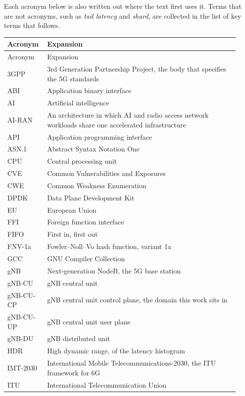 \documentclass[english,oneside,a4paper,censored,csm,software-track-2020]{HYthesisML}
\begin{document}
\noindent Each acronym below is also written out where the text first uses it. Terms that are
not acronyms, such as \emph{tail latency} and \emph{shard}, are collected in
the list of key terms that follows.

\begingroup
\singlespacing
\footnotesize
\renewcommand{\arraystretch}{1.15}
\begin{longtable}{@{}p{0.15\linewidth} p{0.79\linewidth}@{}}
\hline\hline
Acronym & Expansion \\
\hline
\endfirsthead
\hline\hline
Acronym & Expansion \\
\hline
\endhead
3GPP & 3rd Generation Partnership Project, the body that specifies the 5G standards \\
ABI & Application binary interface \\
AI & Artificial intelligence \\
AI-RAN & An architecture in which AI and radio access network workloads share one accelerated infrastructure \\
API & Application programming interface \\
ASN.1 & Abstract Syntax Notation One \\
CPU & Central processing unit \\
CVE & Common Vulnerabilities and Exposures \\
CWE & Common Weakness Enumeration \\
DPDK & Data Plane Development Kit \\
EU & European Union \\
FFI & Foreign function interface \\
FIFO & First in, first out \\
FNV-1a & Fowler--Noll--Vo hash function, variant 1a \\
GCC & GNU Compiler Collection \\
gNB & Next-generation NodeB, the 5G base station \\
gNB-CU & gNB central unit \\
gNB-CU-CP & gNB central unit control plane, the domain this work sits in \\
gNB-CU-UP & gNB central unit user plane \\
gNB-DU & gNB distributed unit \\
HDR & High dynamic range, of the latency histogram \\
IMT-2030 & International Mobile Telecommunications-2030, the ITU framework for 6G \\
ITU & International Telecommunication Union \\

\end{longtable}
\end{document}
